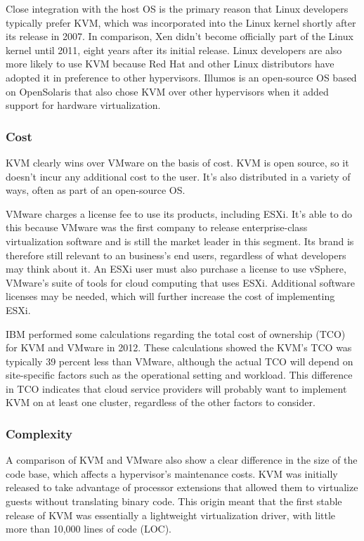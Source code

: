 \documentclass[14pt]{extreport}
\begin{document}
Close integration with the host OS is the primary reason that Linux developers typically prefer KVM, which was incorporated into the Linux kernel shortly after its release in 2007. In comparison, Xen didn’t become officially part of the Linux kernel until 2011, eight years after its initial release. Linux developers are also more likely to use KVM because Red Hat and other Linux distributors have adopted it in preference to other hypervisors. Illumos is an open-source OS based on OpenSolaris that also chose KVM over other hypervisors when it added support for hardware virtualization.
\subsubsection{Cost}

KVM clearly wins over VMware on the basis of cost. KVM is open source, so it doesn’t incur any additional cost to the user. It’s also distributed in a variety of ways, often as part of an open-source OS.

VMware charges a license fee to use its products, including ESXi. It’s able to do this because VMware was the first company to release enterprise-class virtualization software and is still the market leader in this segment. Its brand is therefore still relevant to an business’s end users, regardless of what developers may think about it. An ESXi user must also purchase a license to use vSphere, VMware’s suite of tools for cloud computing that uses ESXi. Additional software licenses may be needed, which will further increase the cost of implementing ESXi.

IBM performed some calculations regarding the total cost of ownership (TCO) for KVM and VMware in 2012. These calculations showed the KVM’s TCO was typically 39 percent less than VMware, although the actual TCO will depend on site-specific factors such as the operational setting and workload. This difference in TCO indicates that cloud service providers will probably want to implement KVM on at least one cluster, regardless of the other factors to consider.
\subsubsection{Complexity}

A comparison of KVM and VMware also show a clear difference in the size of the code base, which affects a hypervisor’s maintenance costs. KVM was initially released to take advantage of processor extensions that allowed them to virtualize guests without translating binary code. This origin meant that the first stable release of KVM was essentially a lightweight virtualization driver, with little more than 10,000 lines of code (LOC).
\end{document}

